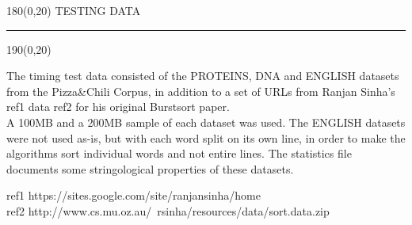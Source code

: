 %

\begin{textblock}{180}(0,20)
\sffamily\normalsize{\color{sciorange}TESTING DATA}\small\\
\rule[3mm]{190mm}{0.1pt}
\end{textblock} 
\begin{textblock}{190}(0,20)
 \footnotesize 
\begin{multicols}{3}
The timing test data consisted of the PROTEINS, DNA and ENGLISH datasets from the Pizza\&Chili Corpus, in addition to a set of URLs from Ranjan Sinha's ref1 data ref2 for his original Burstsort paper. \\

A 100MB and a 200MB sample of each dataset was used. The ENGLISH datasets were not used as-is, but with each word split on its own line, in order to make the algorithms sort individual words and not entire lines. The statistics file documents some stringological properties of these datasets.

ref1 https://sites.google.com/site/ranjansinha/home \\
ref2 http://www.cs.mu.oz.au/~rsinha/resources/data/sort.data.zip \\
\end{multicols}

\end{textblock} 

